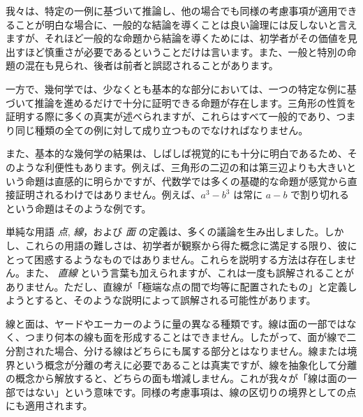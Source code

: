 \documentclass[a4paper,11pt,openany]{ltjsbook}
\begin{document}
我々は、特定の一例に基づいて推論し、他の場合でも同様の考慮事項が適用できることが明白な場合に、一般的な結論を導くことは良い論理には反しないと言えますが、それほど一般的な命題から結論を導くためには、初学者がその価値を見出すほど慎重さが必要であるということだけは言います。また、一般と特別の命題の混在も見られ、後者は前者と誤認されることがあります。

一方で、幾何学では、少なくとも基本的な部分においては、一つの特定な例に基づいて推論を進めるだけで十分に証明できる命題が存在します。三角形の性質を証明する際に多くの真実が述べられますが、これらはすべて一般的であり、つまり同じ種類の全ての例に対して成り立つものでなければなりません。

また、基本的な幾何学の結果は、しばしば視覚的にも十分に明白であるため、そのような利便性もあります。例えば、三角形の二辺の和は第三辺よりも大きいという命題は直感的に明らかですが、代数学では多くの基礎的な命題が感覚から直接証明されるわけではありません。例えば、$a^{3} - b^{3}$ は常に $a - b$ で割り切れるという命題はそのような例です。

単純な用語 \emph{点}, \emph{線}，および \emph{面} の定義は、多くの議論を生み出しました。しかし、これらの用語の難しさは、初学者が観察から得た概念に満足する限り、彼にとって困惑するようなものではありません。これらを説明する方法は存在しません。また、 \emph{直線} という言葉も加えられますが、これは一度も誤解されることがありません。ただし、直線が「極端な点の間で均等に配置されたもの」と定義しようとすると、そのような説明によって誤解される可能性があります。

線と面は、ヤードやエーカーのように量の異なる種類です。線は面の一部ではなく、つまり何本の線も面を形成することはできません。したがって、面が線で二分割された場合、分ける線はどちらにも属する部分とはなりません。線または境界という概念が分離の考えに必要であることは真実ですが、線を抽象化して分離の概念から解放すると、どちらの面も増減しません。これが我々が「線は面の一部ではない」という意味です。同様の考慮事項は、線の区切りの境界としての点にも適用されます。
\end{document}
